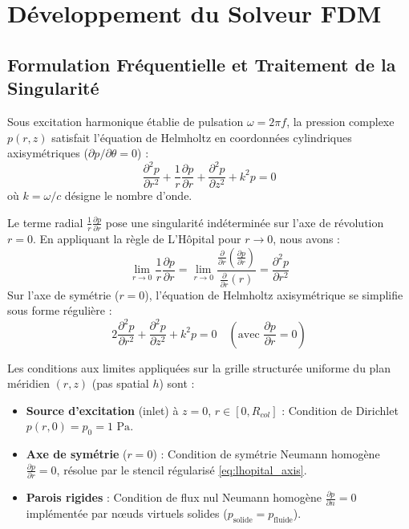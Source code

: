 \documentclass[11pt,a4paper,twocolumn]{article}
\begin{document}
\section{Développement du Solveur FDM}
\subsection{Formulation Fréquentielle et Traitement de la Singularité}
Sous excitation harmonique établie de pulsation $\omega = 2\pi f$, la pression complexe $p(r,z)$ satisfait l'équation de Helmholtz en coordonnées cylindriques axisymétriques ($\partial p/\partial \theta = 0$) :
\begin{equation}
\label{eq:helmholtz_radial}
\frac{\partial^2 p}{\partial r^2} + \frac{1}{r}\frac{\partial p}{\partial r} + \frac{\partial^2 p}{\partial z^2} + k^2 p = 0
\end{equation}
où $k = \omega/c$ désigne le nombre d'onde.

Le terme radial $\frac{1}{r}\frac{\partial p}{\partial r}$ pose une singularité indéterminée sur l'axe de révolution $r=0$. En appliquant la règle de L'Hôpital pour $r \to 0$, nous avons :
\begin{equation}
\lim_{r \to 0} \frac{1}{r}\frac{\partial p}{\partial r} = \lim_{r \to 0} \frac{\frac{\partial}{\partial r}\left(\frac{\partial p}{\partial r}\right)}{\frac{\partial}{\partial r}(r)} = \frac{\partial^2 p}{\partial r^2}
\end{equation}
Sur l'axe de symétrie ($r=0$), l'équation de Helmholtz axisymétrique se simplifie sous forme régulière :
\begin{equation}
\label{eq:lhopital_axis}
2\frac{\partial^2 p}{\partial r^2} + \frac{\partial^2 p}{\partial z^2} + k^2 p = 0 \quad (\text{avec } \frac{\partial p}{\partial r} = 0)
\end{equation}

Les conditions aux limites appliquées sur la grille structurée uniforme du plan méridien $(r,z)$ (pas spatial $h$) sont :
\begin{itemize}
    \item \textbf{Source d'excitation} (inlet) à $z=0$, $r \in [0, R_{col}]$ : Condition de Dirichlet $p(r,0) = p_0 = 1\text{ Pa}$.
    \item \textbf{Axe de symétrie} ($r=0$) : Condition de symétrie Neumann homogène $\frac{\partial p}{\partial r} = 0$, résolue par le stencil régularisé \eqref{eq:lhopital_axis}.
    \item \textbf{Parois rigides} : Condition de flux nul Neumann homogène $\frac{\partial p}{\partial n} = 0$ implémentée par nœuds virtuels solides ($p_{\mathrm{solide}} = p_{\mathrm{fluide}}$).
\end{itemize}
\end{document}
